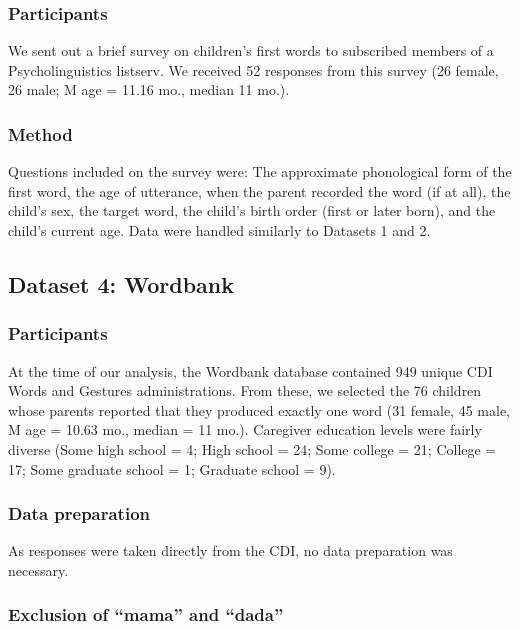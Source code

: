 \documentclass[10pt,letterpaper]{article}
\begin{document}
\subsubsection{Participants}

We sent out a brief survey on children's first words to subscribed members of a Psycholinguistics listserv. We received 52 responses from this survey (26 female, 26 male; M age = 11.16 mo., median 11 mo.).

\subsubsection{Method}

Questions included on the survey were: The approximate phonological form of the first word, the age of utterance, when the parent recorded the word (if at all), the child's sex, the target word, the child's birth order (first or later born), and the child's current age. Data were handled similarly to Datasets 1 and 2. 

\subsection{Dataset 4: Wordbank}

\subsubsection{Participants}

At the time of our analysis, the Wordbank database contained 949 unique CDI Words and Gestures administrations. From these, we selected the 76 children whose parents reported that they produced exactly one word (31 female, 45 male, M age = 10.63 mo., median = 11 mo.). Caregiver education levels were fairly diverse (Some high school = 4; High school = 24; Some college = 21; College = 17; Some graduate school = 1; Graduate school = 9). 

\subsubsection{Data preparation}

As responses were taken directly from the CDI, no data preparation was necessary.


\subsubsection{Exclusion of ``mama'' and ``dada''}
\end{document}
